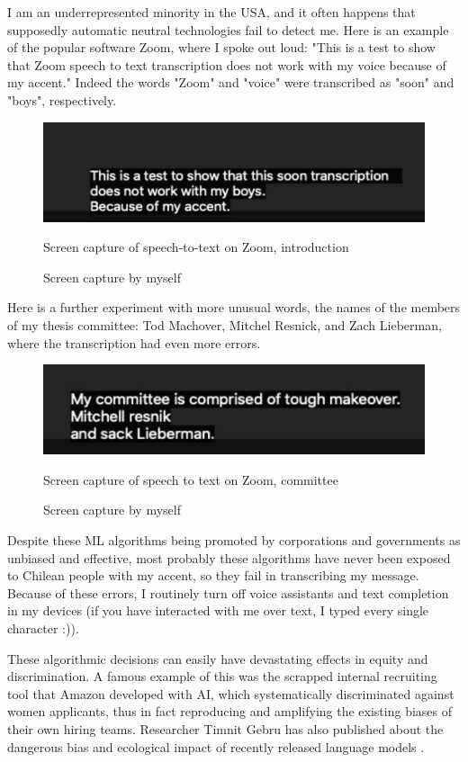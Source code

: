 I am an underrepresented minority in the USA, and it often happens that supposedly automatic neutral technologies fail to detect me. Here is an example of the popular software Zoom, where I spoke out loud: "This is a test to show that Zoom speech to text transcription does not work with my voice because of my accent." Indeed the words "Zoom" and "voice" were transcribed as "soon" and "boys", respectively.

\begin{figure}[ht]
  \centering
  \includegraphics[width=0.75\linewidth,height=0.25\textheight,keepaspectratio]{images/zoom-introduction.jpg}
  \caption{Screen capture of speech-to-text on Zoom, introduction}
  \caption*{Screen capture by myself}
  \label{fig:zoom-voice}
\end{figure}

Here is a further experiment with more unusual words, the names of the members of my thesis committee: Tod Machover, Mitchel Resnick, and Zach Lieberman, where the transcription had even more errors.

\begin{figure}[ht]
  \centering
  \includegraphics[width=0.75\linewidth,height=0.25\textheight,keepaspectratio]{images/zoom-committee.jpg}
  \caption{Screen capture of speech to text on Zoom, committee}
  \caption*{Screen capture by myself}
  \label{fig:zoom-committee}
\end{figure}

Despite these \acrshort{ML} algorithms being promoted by corporations and governments as unbiased and effective, most probably these algorithms have never been exposed to Chilean people with my accent, so they fail in transcribing my message. Because of these errors, I routinely turn off voice assistants and text completion in my devices (if you have interacted with me over text, I typed every single character :)).

These algorithmic decisions can easily have devastating effects in equity and discrimination. A famous example of this was the scrapped internal recruiting tool that Amazon developed with \acrshort{AI}, which systematically discriminated against women applicants, thus in fact reproducing and amplifying the existing biases of their own hiring teams\cite{website-reuters-news-amazon-ai-bias}. Researcher Timnit Gebru has also published about the dangerous bias and ecological impact of recently released language models \cite{wired-timnit-gebru-google}.

